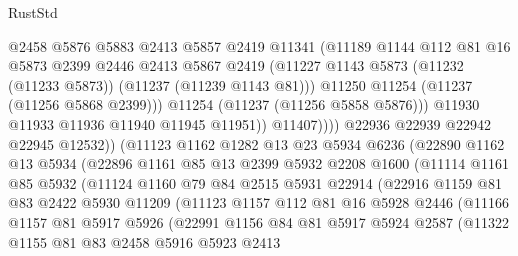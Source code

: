 \begin{lexlean}{RustStd}
\begin{coremodule}
                        @2458
                        @5876
                        @5883
                        @2413
                        @5857
                        @2419
                        @11341
                        (@11189
                          @1144
                          @112
                          @81
                          @16
                          @5873
                          @2399
                          @2446
                          @2413
                          @5867
                          @2419
                          (@11227 @1143 @5873 (@11232 (@11233 @5873)) (@11237 (@11239 @1143 @81)))
                          @11250
                          @11254
                          (@11237 (@11256 @5868 @2399)))
                        @11254
                        (@11237 (@11256 @5858 @5876)))
                      @11930
                      @11933
                      @11936
                      @11940
                      @11945
                      @11951))
                  @11407))))
          @22936
          @22939
          @22942
          @22945
          @12532))
      (@11123
        @1162
        @1282
        @13
        @23
        @5934
        @6236
        (@22890
          @1162
          @13
          @5934
          (@22896
            @1161
            @85
            @13
            @2399
            @5932
            @2208
            @1600
            (@11114
              @1161
              @85
              @5932
              (@11124
                @1160
                @79
                @84
                @2515
                @5931
                @22914
                (@22916
                  @1159
                  @81
                  @83
                  @2422
                  @5930
                  @11209
                  (@11123
                    @1157
                    @112
                    @81
                    @16
                    @5928
                    @2446
                    (@11166
                      @1157
                      @81
                      @5917
                      @5926
                      (@22991
                        @1156
                        @84
                        @81
                        @5917
                        @5924
                        @2587
                        (@11322
                          @1155
                          @81
                          @83
                          @2458
                          @5916
                          @5923
                          @2413

\end{coremodule}
\end{lexlean}
